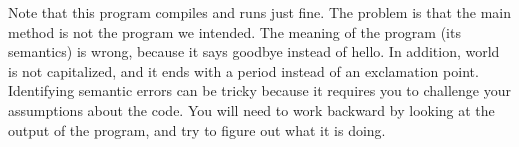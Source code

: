 Note that this program compiles and runs just fine.
The problem is that the main method is not the program we intended.
The meaning of the program (its semantics) is wrong, because it says goodbye instead of hello. In addition, world is not capitalized, and it ends with a period instead of an exclamation point.
Identifying semantic errors can be tricky because it requires you to challenge your assumptions about the code.
You will need to work backward by looking at the output of the program, and try to figure out what it is doing.
